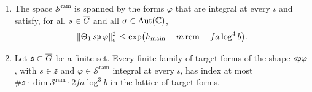 \begin{theorem}\label{main:thm:A}
\leavevmode
\begin{enumerate}[label=(\alph*)]
\item The space $\mathcal{S}^{\mathrm{ram}}$ is spanned by the forms $\varphi$ that are integral
  at every $\iota$ and satisfy, for all $s \in \overline{G}$ and all $\sigma \in \operatorname{Aut}(\mathbb{C})$,
  \[
    \lVert\Theta_1\, s\mathfrak{p}\,\varphi\rVert_\sigma^2 \le \exp\bigl( h_{\mathrm{main}} - m\,\mathrm{rem} + f a \log^4 b \bigr).
  \]
\item Let $\mathfrak{s} \subset \overline{G}$ be a finite set. Every finite family of target forms of the shape
  $s\mathfrak{p}\varphi$, with $s \in \mathfrak{s}$ and $\varphi \in \mathcal{S}^{\mathrm{ram}}$ integral at every
  $\iota$, has index at most $\#\mathfrak{s}\cdot\dim\mathcal{S}^{\mathrm{ram}}\cdot 2 f a\log^3 b$ in the
  lattice of target forms.
\end{enumerate}
\end{theorem}


